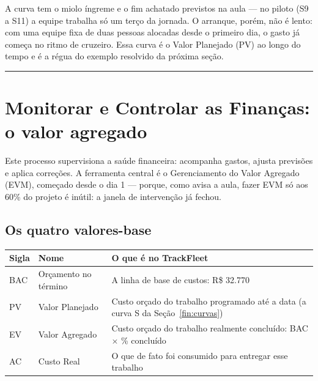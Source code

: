 \documentclass[11pt,a4paper]{article}
\newcommand{\separador}{\par\vspace{2mm}\hrule\vspace{4mm}}
\begin{document}
\noindent A curva tem o miolo íngreme e o fim achatado previstos na aula --- no piloto (S9 a S11) a equipe trabalha só um terço da jornada. O arranque, porém, não é lento: com uma equipe fixa de duas pessoas alocadas desde o primeiro dia, o gasto já começa no ritmo de cruzeiro. Essa curva é o Valor Planejado (PV) ao longo do tempo e é a régua do exemplo resolvido da próxima seção.

\separador

\section{Monitorar e Controlar as Finanças: o valor agregado}\label{fin:controlar}

\noindent Este processo supervisiona a saúde financeira: acompanha gastos, ajusta previsões e aplica correções. A ferramenta central é o Gerenciamento do Valor Agregado (EVM), começado desde o dia 1 --- porque, como avisa a aula, fazer EVM só aos 60\% do projeto é inútil: a janela de intervenção já fechou.

\subsection{Os quatro valores-base}
\begin{center}
\begin{tabularx}{\textwidth}{l L L}
\toprule
\textbf{Sigla} & \textbf{Nome} & \textbf{O que é no TrackFleet} \\
\midrule
BAC & Orçamento no término & A linha de base de custos: R\$ 32.770 \\
PV & Valor Planejado & Custo orçado do trabalho programado até a data (a curva S da Seção~\ref{fin:curvas}) \\
EV & Valor Agregado & Custo orçado do trabalho realmente concluído: BAC $\times$ \% concluído \\
AC & Custo Real & O que de fato foi consumido para entregar esse trabalho \\
\bottomrule
\end{tabularx}
\end{center}
\end{document}
